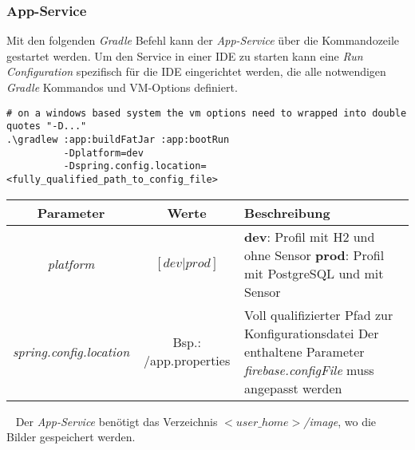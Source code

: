 \documentclass[]{article}
\begin{document}
{{\subsubsection{App-Service}
Mit den folgenden \emph{Gradle} Befehl kann der \emph{App-Service} über die Kommandozeile gestartet werden. Um den Service in einer IDE zu starten kann eine \emph{Run Configuration} spezifisch für die IDE eingerichtet werden, die alle notwendigen \emph{Gradle} Kommandos und VM-Options definiert.
\begin{verbatim}
# on a windows based system the vm options need to wrapped into double quotes "-D..."
.\gradlew :app:buildFatJar :app:bootRun
	      -Dplatform=dev              
	      -Dspring.config.location=<fully_qualified_path_to_config_file>
\end{verbatim}
{\renewcommand{\arraystretch}{2}%
\begin{center}
	\begin{tabular}{| c | c | p{8.3cm} |}
		\hline
		\textbf{Parameter} & \textbf{Werte} & \textbf{Beschreibung}  \\ \hline
		\textit{platform} & $[dev|prod]$ & \textbf{dev}: Profil mit H2 und ohne Sensor \newline
		\textbf{prod}: Profil mit PostgreSQL und mit Sensor \\ \hline
		\textit{spring.config.location} & Bsp.: /app.properties & Voll qualifizierter Pfad zur Konfigurationsdatei
		\newline 
		Der enthaltene Parameter \emph{firebase.configFile} muss angepasst werden  \\ \hline
	\end{tabular}
\end{center}
\ \newline
Der \emph{App-Service} benötigt das Verzeichnis \emph{$<user\_home>$/image}, wo die Bilder gespeichert werden. 

}}}
\end{document}
